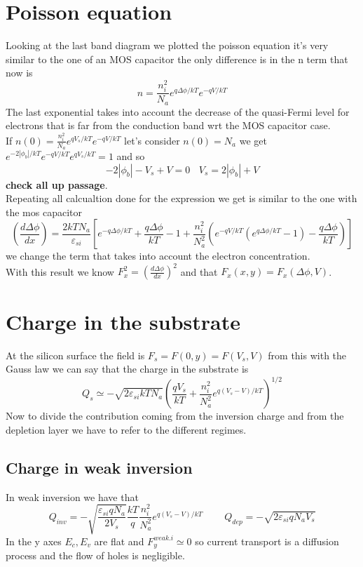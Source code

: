 \section{Poisson equation}
Looking at the last band diagram we plotted the poisson equation it's very similar to the one of an MOS capacitor the only difference is in the n term that now is 
\begin{equation}
n=\frac{n_i^2}{N_a}e^{q\Delta \phi /kT}e^{-qV/kT}
\end{equation}
The last exponential takes into account the decrease of the quasi-Fermi level for electrons that is far from the conduction band wrt the MOS capacitor case.\\
If $n(0)=\frac{n_i^2}{N_a}e^{qV_s/kT}e^{-qV/kT}$ let's consider $n(0)=N_a$ we get $e^{-2|\phi_b|/kT}e^{-qV/kT}e^{qV_s/kT}=1$ and so
\begin{equation}
-2|\phi_b|-V_s+V=0 \ \ \ \ V_s=2|\phi_b|+V
\end{equation}
{\bf check all up passage}.\\
Repeating all calcualtion done for the expression we get is similar to the one with the mos capacitor
\begin{equation}
\left(\frac{d\Delta\phi}{dx}\right)=\frac{2kTN_a}{\varepsilon_{si}}[e^{-q\Delta\phi/kT}+\frac{q\Delta\phi}{kT}-1+\frac{n_i^2}{N_a^2}\left(e^{-qV/kT}(e^{q\Delta\phi/kT}-1)-\frac{q\Delta\phi}{kT}\right)]
\end{equation}
we change the term that takes into account the electron concentration.\\
With this result we know $F_x^2=\left(\frac{d\Delta\phi}{dx}\right)^2$ and that $F_x(x,y)=F_x(\Delta\phi,V)$.\\

\section{Charge in the substrate}
At the silicon surface the field is $F_s=F(0,y)=F(V_s,V)$ from this with the Gauss law we can say that the charge in the substrate is 
\begin{equation}
Q_s\simeq-\sqrt{2\varepsilon_{si}kTN_a}\left(\frac{qV_s}{kT}+\frac{n_i^2}{N_a^2}e^{q(V_s-V)/kT}\right)^{1/2}
\end{equation}
Now to divide the contribution coming from the inversion charge and from the depletion layer we have to refer to the different regimes.\\

\subsection{Charge in weak inversion}
In weak inversion we have that 
\begin{equation}
Q_{inv}=-\sqrt{\frac{\varepsilon_{si}qN_a}{2V_s}}\frac{kT}{q}\frac{n_i^2}{N_a^2}e^{q(V_s-V)/kT}\ \ \ \ \ \ \ \ \ \ Q_{dep}=-\sqrt{2\varepsilon_{si}qN_aV_s}
\end{equation}
In the y axes $E_c, E_v$ are flat and $F_y^{weak.i}\simeq0$ so current transport is a diffusion process and the flow of holes is negligible.
